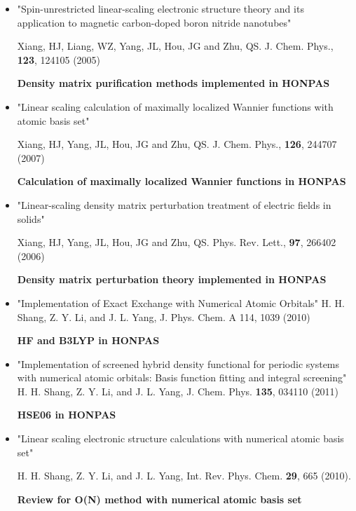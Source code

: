 \documentclass[11pt]{article}
\begin{document}
\begin{itemize}

\item  "Spin-unrestricted linear-scaling electronic structure theory and its application to magnetic carbon-doped boron nitride nanotubes"

Xiang, HJ, Liang, WZ, Yang, JL, Hou, JG and Zhu, QS. J. Chem. Phys., {\bf 123}, 124105  (2005)

{\bf Density matrix purification methods implemented in {\sc HONPAS} }


\item "Linear scaling calculation of maximally localized Wannier functions with atomic basis set"

Xiang, HJ, Yang, JL, Hou, JG and Zhu, QS. J. Chem. Phys., {\bf 126}, 244707 (2007)

{\bf Calculation of maximally localized Wannier functions in 
{\sc HONPAS} }

\item "Linear-scaling density matrix perturbation treatment of electric fields in solids"

Xiang, HJ, Yang, JL, Hou, JG and Zhu, QS.  Phys. Rev. Lett., {\bf 97}, 266402 (2006)

{\bf Density matrix perturbation theory implemented in {\sc HONPAS} } 




\item "Implementation of Exact Exchange with Numerical Atomic Orbitals"
H. H. Shang, Z. Y. Li, and J. L. Yang, J. Phys. Chem. A 114, 1039 (2010)

{\bf HF and B3LYP in {\sc HONPAS}}


\item "Implementation of screened hybrid density functional for periodic systems with numerical atomic orbitals: Basis function fitting and integral screening"
H. H. Shang, Z. Y. Li, and J. L. Yang, J. Chem. Phys. {\bf 135}, 034110 (2011)

{\bf HSE06 in {\sc HONPAS}}


\item "Linear scaling electronic structure calculations with numerical atomic basis set"

H. H. Shang, Z. Y. Li, and J. L. Yang, Int. Rev. Phys. Chem. {\bf 29}, 665 (2010).

{\bf Review for O(N) method with numerical atomic basis set}

\end{itemize}
\end{document}
